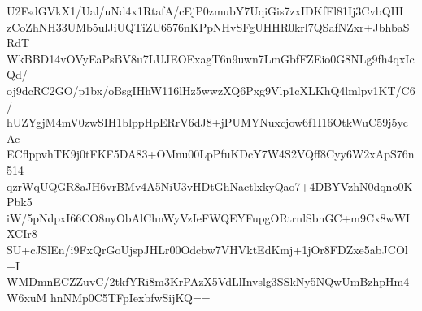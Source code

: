 U2FsdGVkX1/Ual/uNd4x1RtafA/cEjP0zmubY7UqiGis7zxIDKfFl81Ij3CvbQHI
zCoZhNH33UMb5ulJiUQTiZU6576nKPpNHvSFgUHHR0krl7QSafNZxr+JbhbaSRdT
WkBBD14vOVyEaPsBV8u7LUJEOExagT6n9uwn7LmGbfFZEio0G8NLg9fh4qxIcQd/
oj9dcRC2GO/p1bx/oBsgIHhW116lHz5wwzXQ6Pxg9Vlp1cXLKhQ4lmlpv1KT/C6/
hUZYgjM4mV0zwSIH1blppHpERrV6dJ8+jPUMYNuxcjow6f1I16OtkWuC59j5ycAc
ECflppvhTK9j0tFKF5DA83+OMnu00LpPfuKDcY7W4S2VQff8Cyy6W2xApS76n514
qzrWqUQGR8aJH6vrBMv4A5NiU3vHDtGhNactlxkyQao7+4DBYVzhN0dqno0KPbk5
iW/5pNdpxI66CO8nyObAlChnWyVzIeFWQEYFupgORtrnlSbnGC+m9Cx8wWIXCIr8
SU+cJSlEn/i9FxQrGoUjspJHLr00Odcbw7VHVktEdKmj+1jOr8FDZxe5abJCOl+I
WMDmnECZZuvC/2tkfYRi8m3KrPAzX5VdLlInvslg3SSkNy5NQwUmBzhpHm4W6xuM
hnNMp0C5TFpIexbfwSijKQ==
